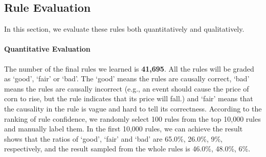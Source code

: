 
\subsection{Rule Evaluation}
In this section, we evaluate these rules both quantitatively and qualitatively.
\paragraph{Quantitative Evaluation}
The number of the final rules we learned is \textbf{41,695}. All the rules will be graded as `good', `fair' or `bad'. The `good' means the rules are causally correct, `bad' means the rules are causally incorrect (e.g., an event should cause the price of corn to rise, but the rule indicates that its price will fall.) and `fair' means that the causality in the rule is vague and hard to tell its correctness. According to the ranking of rule confidence, we randomly select 100 rules from the top 10,000 rules and manually label them. In the first 10,000 rules, we can achieve the result shows that the ratios of `good', `fair' and `bad' are 65.0\%, 26.0\%, 9\%, respectively, and the result sampled from the whole rules is 46.0\%, 48.0\%, 6\%.

